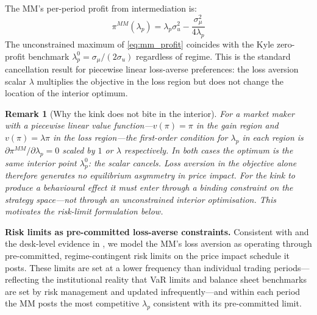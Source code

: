 \documentclass[12pt,a4paper]{article}
\newtheorem{remark}[theorem]{Remark}
\theoremstyle{definition}
\begin{document}
The MM's per-period profit from intermediation is:
\begin{equation}
  \pi^{MM}(\lambda_p)
  = \lambda_p\sigma^2_u - \frac{\sigma^2_\mu}{4\lambda_p}
  \label{eq:mm_profit}
\end{equation}
The unconstrained maximum of \eqref{eq:mm_profit} coincides with the
Kyle zero-profit benchmark $\lambda^0_p = \sigma_\mu/(2\sigma_u)$
regardless of regime. This is the standard cancellation result for
piecewise linear loss-averse preferences: the loss aversion scalar
$\lambda$ multiplies the objective in the loss region but does not
change the location of the interior optimum.

\begin{remark}[Why the kink does not bite in the interior]
\label{rem:kink_interior}
For a market maker with a piecewise linear value function---$v(\pi) =
\pi$ in the gain region and $v(\pi) = \lambda\pi$ in the loss
region---the first-order condition for $\lambda_p$ in each region is
$\partial\pi^{MM}/\partial\lambda_p = 0$ scaled by $1$ or $\lambda$
respectively. In both cases the optimum is the same interior point
$\lambda^0_p$: the scalar cancels. Loss aversion in the objective
alone therefore generates no equilibrium asymmetry in price impact.
For the kink to produce a behavioural effect it must enter through a
binding constraint on the strategy space---not through an unconstrained
interior optimisation. This motivates the risk-limit formulation below.
\end{remark}

\noindent\textbf{Risk limits as pre-committed loss-averse constraints.}
Consistent with \citet{adrian2014} and the desk-level evidence in
\citet{li2025}, we model the MM's loss aversion as operating through
pre-committed, regime-contingent risk limits on the price impact
schedule it posts. These limits are set at a lower frequency than
individual trading periods---reflecting the institutional reality that
VaR limits and balance sheet benchmarks are set by risk management
and updated infrequently---and within each period the MM posts the most
competitive $\lambda_p$ consistent with its pre-committed limit.
\end{document}
